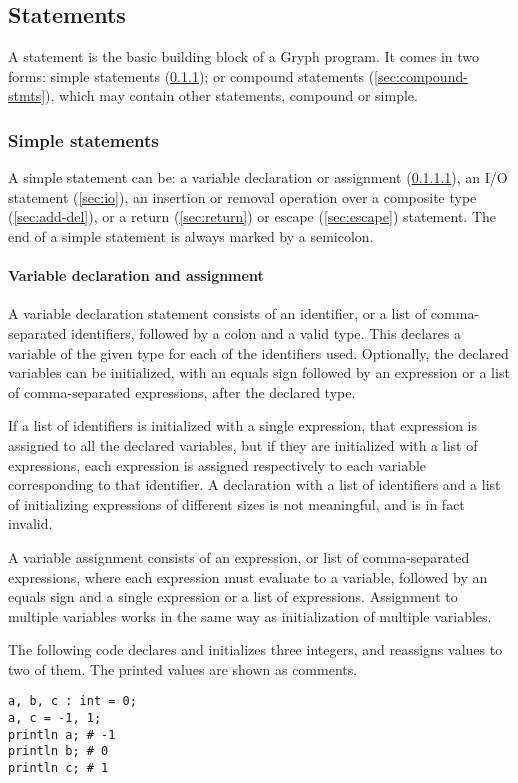 \subsection{Statements}
\label{sec:statements}
A statement is the basic building block of a Gryph program. It comes in two forms: simple statements (\ref{sec:simple-stmts}); or compound statements (\ref{sec:compound-stmts}), which may contain other statements, compound or simple.

\subsubsection{Simple statements}
\label{sec:simple-stmts}
A simple statement can be: a variable declaration or assignment (\ref{sec:variables}), an I/O statement (\ref{sec:io}), an insertion or removal operation over a composite type (\ref{sec:add-del}), or a return (\ref{sec:return}) or escape (\ref{sec:escape}) statement. The end of a simple statement is always marked by a semicolon.

\paragraph{Variable declaration and assignment}
\label{sec:variables}

A variable declaration statement consists of an identifier, or a list of comma-separated identifiers, followed by a colon and a valid type. This declares a variable of the given type for each of the identifiers used. Optionally, the declared variables can be initialized, with an equals sign followed by an expression or a list of comma-separated expressions, after the declared type. 

If a list of identifiers is initialized with a single expression, that expression is assigned to all the declared variables, but if they are initialized with a list of expressions, each expression is assigned respectively to each variable corresponding to that identifier. A declaration with a list of identifiers and a list of initializing expressions of different sizes is not meaningful, and is in fact invalid.

A variable assignment consists of an expression, or list of comma-separated expressions, where each expression must evaluate to a variable, followed by an equals sign and a single expression or a list of expressions. Assignment to multiple variables works in the same way as initialization of multiple variables.

The following code declares and initializes three integers, and reassigns values to two of them. The printed values are shown as comments.
\begin{lstlisting}[language=Gryph]
a, b, c : int = 0;
a, c = -1, 1;
println a; # -1
println b; # 0
println c; # 1
\end{lstlisting}


